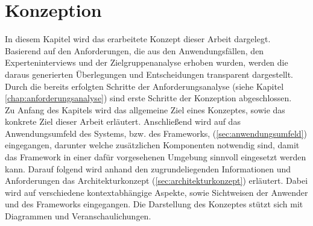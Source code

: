 \chapter{Konzeption}
\label{chap:konzept}
    In diesem Kapitel wird das erarbeitete Konzept dieser Arbeit dargelegt. Basierend auf den 
    Anforderungen, die aus den Anwendungsfällen, den Experteninterviews und der Zielgruppenanalyse 
    erhoben wurden, werden die daraus generierten Überlegungen und Entscheidungen transparent 
    dargestellt. Durch die bereits erfolgten Schritte der Anforderungsanalyse (siehe Kapitel \ref{chap:anforderungsanalyse})
    sind erste Schritte der Konzeption abgeschlossen. 
    \\
    Zu Anfang des Kapitels wird das allgemeine Ziel eines Konzeptes, sowie das konkrete Ziel dieser Arbeit 
    erläutert. Anschließend 
    wird auf das Anwendungsumfeld des Systems, bzw. des Frameworks, (\ref{sec:anwendungsumfeld}) eingegangen, darunter 
    welche zusätzlichen Komponenten notwendig sind, damit das Framework in einer dafür vorgesehenen Umgebung sinnvoll 
    eingesetzt werden kann.
    Darauf folgend wird anhand den 
    zugrundeliegenden Informationen und Anforderungen das Architekturkonzept (\ref{sec:architekturkonzept}) erläutert. %
    Dabei wird auf verschiedene kontextabhängige Aspekte, sowie Sichtweisen der Anwender und des Frameworks eingegangen.
    Die Darstellung des Konzeptes stützt sich mit Diagrammen und Veranschaulichungen.

